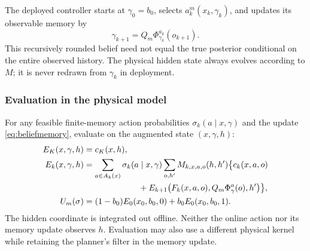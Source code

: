 The deployed controller starts at $\gamma_0=b_0$, selects
$a_k^m(x_k,\gamma_k)$, and updates its observable memory by
\begin{equation}\label{eq:beliefmemory}
 \gamma_{k+1}=Q_m\Phi_{\gamma_k}^{a_k}(o_{k+1}).
\end{equation}
This recursively rounded belief need not equal the true posterior conditional
on the entire observed history. The physical hidden state always evolves
according to $M$; it is never redrawn from $\gamma_k$ in deployment.

\subsubsection*{Evaluation in the physical model}

For any feasible finite-memory action probabilities $\sigma_k(a\mid x,\gamma)$
and the update \eqref{eq:beliefmemory}, evaluate on the augmented state
$(x,\gamma,h)$:
\begin{align}\label{eq:truecontrollerevaluation}
 E_K(x,\gamma,h)&=c_K(x,h),\nonumber\\
 E_k(x,\gamma,h)&=\sum_{a\in A_k(x)}\sigma_k(a\mid x,\gamma)
 \sum_{o,h'}M_{k,x,a,o}(h,h')\bigl\{c_k(x,a,o)\nonumber\\
 &\hspace{23mm}+E_{k+1}\bigl(F_k(x,a,o),Q_m\Phi_\gamma^a(o),h'\bigr)\bigr\},\\
 U_m(\sigma)&=(1-b_0)E_0(x_0,b_0,0)+b_0E_0(x_0,b_0,1).\nonumber
\end{align}
The hidden coordinate is integrated out offline. Neither the online action
nor its memory update observes $h$. Evaluation may also use a different
physical kernel while retaining the planner's filter in the memory update.

